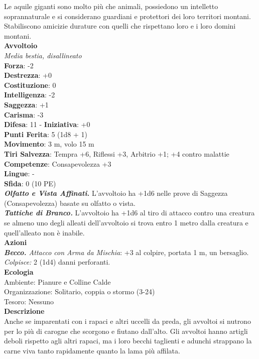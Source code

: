\begin{multicols}{2}
Le aquile giganti sono molto più che animali, possiedono un intelletto soprannaturale e si considerano guardiani e protettori dei loro territori montani.\\

Stabiliscono amicizie durature con quelli che rispettano loro e i loro domini montani.\\

\medskip\textbf{Avvoltoio}\\
\emph{Media bestia, disallineato}\\
\textbf{Forza}: -2\\
\textbf{Destrezza}: +0\\
\textbf{Costituzione}: 0\\
\textbf{Intelligenza}: -2\\
\textbf{Saggezza}: +1\\
\textbf{Carisma}: -3\\
\textbf{Difesa}: 11 - \textbf{Iniziativa}: +0\\
\textbf{Punti Ferita}: 5 (1d8 + 1)\\
\textbf{Movimento}: 3 m, volo 15 m\\
\textbf{Tiri Salvezza}: Tempra +6, Riflessi +3, Arbitrio +1; +4 contro malattie\\
\textbf{Competenze}: Consapevolezza +3\\
\textbf{Lingue}: -\\
\textbf{Sfida}: 0 (10 PE)\smallskip\\
\emph{\textbf{Olfatto e Vista Affinati.}} L'avvoltoio ha +1d6 nelle prove di Saggezza (Consapevolezza) basate su olfatto o vista.\\
\emph{\textbf{Tattiche di Branco.}} L'avvoltoio ha +1d6 al tiro di attacco contro una creatura se almeno uno degli alleati dell'avvoltoio si trova entro 1 metro dalla creatura e quell'alleato non è inabile.\\
\smallskip\textbf{Azioni}\\
\emph{\textbf{Becco.} Attacco con Arma da Mischia}: +3 al colpire, portata 1 m, un bersaglio.\\
\emph{Colpisce:} 2 (1d4) danni perforanti.\\
\textbf{Ecologia}\\
Ambiente: Pianure e Colline Calde\\
Organizzazione: Solitario, coppia o stormo (3-24)\\
Tesoro: Nessuno\\
\textbf{Descrizione}\\
Anche se imparentati con i rapaci e altri uccelli da preda, gli avvoltoi si nutrono per lo più di carogne che scorgono e fiutano dall'alto. Gli avvoltoi hanno artigli deboli rispetto agli altri rapaci, ma i loro becchi taglienti e adunchi strappano la carne viva tanto rapidamente quanto la lama più affilata.\\


\end{multicols}
